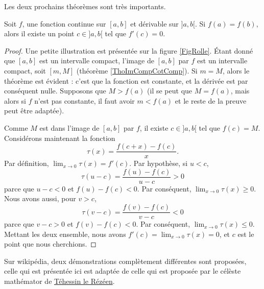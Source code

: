 \documentclass{article}
\begin{document}
Les deux prochains théorèmes sont très importants.
\begin{theorem}		\label{ThoRolle}
	Soit $f$, une fonction continue sur $[a,b]$ et dérivable sur $]a,b[$. Si $f(a)=f(b)$, alors il existe un point $c\in]a,b[$ tel que $f'(c)=0$.
\end{theorem}
\newcommand{\CaptionRolle}{Illustration du théorème de Rolle. Nous avons $f(a)=f(b)$, et effectivement, au point $c$, la tangente est horizonale (dérivée nulle).}


\begin{proof}
	Une petite illustration est présentée sur la figure \ref{FigRolle}.
	Étant donné que $[a,b]$ est un intervalle compact, l'image de $[a,b]$ par $f$ est un intervalle compact, soit $[m,M]$ (théorème \ref{ThoImCompCotComp}). Si $m=M$, alors le théorème est évident : c'est que la fonction est constante, et la dérivée est par conséquent nulle. Supposons que $M> f(a)$ (il se peut que $M=f(a)$, mais alors si $f$ n'est pas constante, il faut avoir $m<f(a)$ et le reste de la preuve peut être adaptée).

	Comme $M$ est dans l'image de $[a,b]$ par $f$, il existe $c\in ]a,b[$ tel que $f(c)=M$. Considérons maintenant la fonction
	\begin{equation}
		\tau(x) =\frac{ f(c+x)-f(c) }{ x }.
	\end{equation}
	Par définition, $\lim_{x\to 0}\tau(x)=f'(c)$. Par hypothèse, si $u<c$,
	\begin{equation}
		\tau(u-c) = \frac{ f(u)-f(c) }{ u-c }>0
	\end{equation}
	parce que $u-c<0$ et $f(u)-f(c)<0$. Par conséquent, $\lim_{x\to 0}\tau(x)\geq 0$. Nous avons aussi, pour $v>c$,
	\begin{equation}
		\tau(v-c) = \frac{ f(v)-f(c) }{ v-c }<0
	\end{equation}
	parce que $v-c>0$ et $f(v)-f(c)<0$. Par conséquent, $\lim_{x\to 0}\tau(x)\leq 0$. Mettant les deux ensemble, nous avons $f'(c)=\lim_{x\to 0}\tau(x)=0$, et $c$ est le point que nous cherchions.
\end{proof}

Sur wikipédia, deux démonstrations complètement différentes sont proposées, celle qui est présentée ici est adaptée de celle qui est proposée par le célèste mathémator de \href{http://gconnan.free.fr/les\%20pdf/Deriv.pdf}{Téhessin le Rézéen}.
\end{document}

